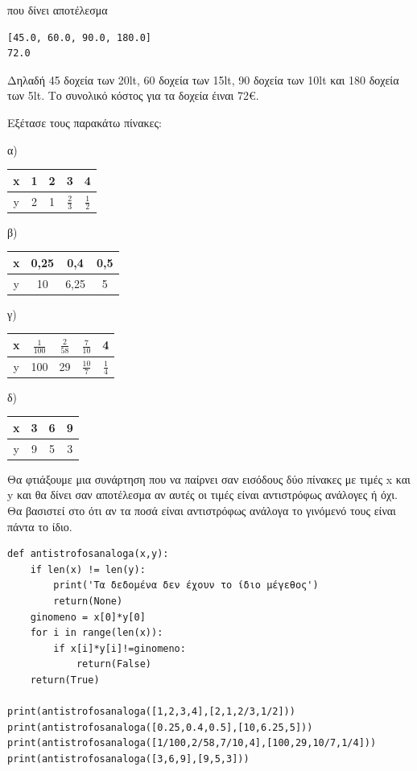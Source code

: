 που δίνει αποτέλεσμα
\begin{lstlisting}
[45.0, 60.0, 90.0, 180.0]
72.0
\end{lstlisting}
Δηλαδή 45 δοχεία των 20lt, 60 δοχεία των 15lt, 90 δοχεία των 10lt και 180 δοχεία των 5lt. Το συνολικό κόστος για τα δοχεία έιναι 72€.
\begin{exercise}
Εξέτασε τους παρακάτω πίνακες:

α)

\begin{table}
\begin{tabular}{|c|c|c|c|c|}
x&1&2&3&4\\\hline
y&2&1&$\frac{2}{3}$&$\frac{1}{2}$\\\hline
\end{tabular}
\end{table}

β)

\begin{table}
\begin{tabular}{|c|c|c|c|}
x&0,25&0,4&0,5\\\hline
y&10&6,25&5\\\hline
\end{tabular}
\end{table}

γ)

\begin{table}
\begin{tabular}{|c|c|c|c|c|}
x&$\frac{1}{100}$&$\frac{2}{58}$&$\frac{7}{10}$&4\\\hline
y&100&29&$\frac{10}{7}$&$\frac{1}{4}$\\\hline
\end{tabular}
\end{table}

δ)

\begin{table}
\begin{tabular}{|c|c|c|c|}
x&3&6&9\\\hline
y&9&5&3\\\hline
\end{tabular}
\end{table}

\end{exercise}
Θα φτιάξουμε μια συνάρτηση που να παίρνει σαν εισόδους δύο πίνακες με τιμές x και y και θα δίνει σαν αποτέλεσμα αν αυτές οι τιμές είναι αντιστρόφως ανάλογες ή όχι. Θα βασιστεί στο ότι αν τα ποσά είναι αντιστρόφως ανάλογα το γινόμενό τους είναι πάντα το ίδιο.
\begin{lstlisting}
def antistrofosanaloga(x,y):
    if len(x) != len(y):
        print('Τα δεδομένα δεν έχουν το ίδιο μέγεθος')
        return(None)
    ginomeno = x[0]*y[0]
    for i in range(len(x)):
        if x[i]*y[i]!=ginomeno:
            return(False)
    return(True)

print(antistrofosanaloga([1,2,3,4],[2,1,2/3,1/2]))
print(antistrofosanaloga([0.25,0.4,0.5],[10,6.25,5]))
print(antistrofosanaloga([1/100,2/58,7/10,4],[100,29,10/7,1/4]))
print(antistrofosanaloga([3,6,9],[9,5,3]))
\end{lstlisting}

